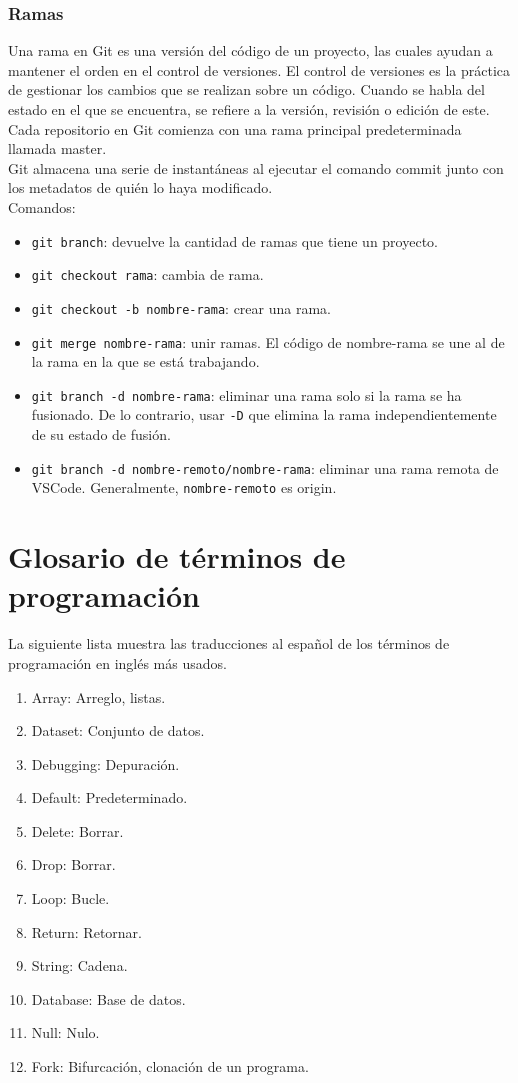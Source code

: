 \documentclass[a4paper, 12pt]{book}
\begin{document}
\subsection{Ramas}
Una rama en Git es una versión del código de un proyecto, las cuales ayudan a mantener el orden en el control de versiones. El control de versiones es la práctica de gestionar los cambios que se realizan sobre un código. Cuando se habla del estado en el que se encuentra, se refiere a la versión, revisión o edición de este. \\
Cada repositorio en Git comienza con una rama principal predeterminada llamada master. \\
Git almacena una serie de instantáneas al ejecutar el comando commit junto con los metadatos de quién lo haya modificado. \\
Comandos:
\begin{itemize}
\item \texttt{git branch}: devuelve la cantidad de ramas que tiene un proyecto.
\item \texttt{git checkout rama}: cambia de rama.
\item \texttt{git checkout -b nombre-rama}: crear una rama.
\item \texttt{git merge nombre-rama}: unir ramas. El código de nombre-rama se une al de la rama en la que se está trabajando.
\item \texttt{git branch -d nombre-rama}: eliminar una rama solo si la rama se ha fusionado. De lo contrario, usar \texttt{-D} que elimina la rama independientemente de su estado de fusión.
\item \texttt{git branch -d nombre-remoto/nombre-rama}: eliminar una rama remota de VSCode. Generalmente, \texttt{nombre-remoto} es origin.
\end{itemize}

%

\chapter{Glosario de términos de programación}
La siguiente lista muestra las traducciones al español de los términos de programación en inglés más usados.
\begin{enumerate}
	\item Array: Arreglo, listas.
	\item Dataset: Conjunto de datos.
	\item Debugging: Depuración.
	\item Default: Predeterminado.
	\item Delete: Borrar.
	\item Drop: Borrar.
	\item Loop: Bucle.
	\item Return: Retornar.
	\item String: Cadena.
	\item Database: Base de datos.
	\item Null: Nulo.
	\item Fork: Bifurcación, clonación de un programa.
\end{enumerate} 
\end{document}
